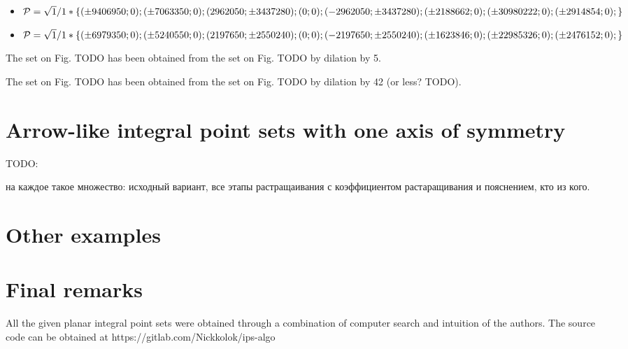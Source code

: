 \documentclass[12pt]{article}
\theoremstyle{theorem}
\theoremstyle{dfn}
\theoremstyle{remark}
\begin{document}
\begin{itemize}
\item
$\mathcal{P}=\sqrt{1}/1*\{
( \pm9406950 ; 0);
( \pm7063350 ; 0);
( 2962050 ; \pm3437280);
( 0 ; 0);
( -2962050 ; \pm3437280);\\
( \pm2188662 ; 0);
( \pm30980222 ; 0);
( \pm2914854 ; 0);
\}$

\item
$\mathcal{P}=\sqrt{1}/1*\{
( \pm6979350 ; 0);
( \pm5240550 ; 0);
( 2197650 ; \pm2550240);
( 0 ; 0);
( -2197650 ; \pm2550240);\\
( \pm1623846 ; 0);
( \pm22985326 ; 0);
( \pm2476152 ; 0);
\}$
\end{itemize}



The set on Fig. TODO has been obtained from the set on Fig. TODO by dilation by 5.

The set on Fig. TODO has been obtained from the set on Fig. TODO by dilation by 42 (or less? TODO).

\section{Arrow-like integral point sets with one axis of symmetry}

TODO:

на каждое такое множество: исходный вариант, все этапы растращаивания с коэффициентом растаращивания и пояснением, кто из кого.


\section{Other examples}



\section{Final remarks}
All the given planar integral point sets were obtained through a combination of computer search and intuition of the authors.
The source code can be obtained at https://gitlab.com/Nickkolok/ips-algo

\printbibliography
\end{document}
